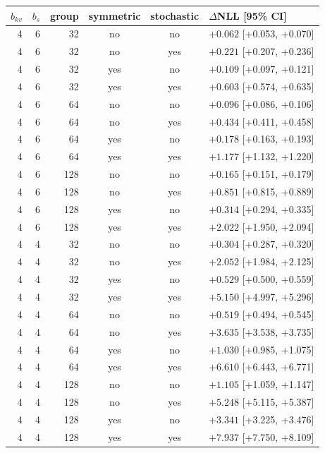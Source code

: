 \begin{tabular}{rrrccl}
\toprule
$b_{kv}$ & $b_s$ & group & symmetric & stochastic & $\Delta$NLL [95\% CI] \\
\midrule
4 & 6 & 32 & no & no & $+0.062$ [+0.053, +0.070] \\
4 & 6 & 32 & no & yes & $+0.221$ [+0.207, +0.236] \\
4 & 6 & 32 & yes & no & $+0.109$ [+0.097, +0.121] \\
4 & 6 & 32 & yes & yes & $+0.603$ [+0.574, +0.635] \\
4 & 6 & 64 & no & no & $+0.096$ [+0.086, +0.106] \\
4 & 6 & 64 & no & yes & $+0.434$ [+0.411, +0.458] \\
4 & 6 & 64 & yes & no & $+0.178$ [+0.163, +0.193] \\
4 & 6 & 64 & yes & yes & $+1.177$ [+1.132, +1.220] \\
4 & 6 & 128 & no & no & $+0.165$ [+0.151, +0.179] \\
4 & 6 & 128 & no & yes & $+0.851$ [+0.815, +0.889] \\
4 & 6 & 128 & yes & no & $+0.314$ [+0.294, +0.335] \\
4 & 6 & 128 & yes & yes & $+2.022$ [+1.950, +2.094] \\
4 & 4 & 32 & no & no & $+0.304$ [+0.287, +0.320] \\
4 & 4 & 32 & no & yes & $+2.052$ [+1.984, +2.125] \\
4 & 4 & 32 & yes & no & $+0.529$ [+0.500, +0.559] \\
4 & 4 & 32 & yes & yes & $+5.150$ [+4.997, +5.296] \\
4 & 4 & 64 & no & no & $+0.519$ [+0.494, +0.545] \\
4 & 4 & 64 & no & yes & $+3.635$ [+3.538, +3.735] \\
4 & 4 & 64 & yes & no & $+1.030$ [+0.985, +1.075] \\
4 & 4 & 64 & yes & yes & $+6.610$ [+6.443, +6.771] \\
4 & 4 & 128 & no & no & $+1.105$ [+1.059, +1.147] \\
4 & 4 & 128 & no & yes & $+5.248$ [+5.115, +5.387] \\
4 & 4 & 128 & yes & no & $+3.341$ [+3.225, +3.476] \\
4 & 4 & 128 & yes & yes & $+7.937$ [+7.750, +8.109] \\
\bottomrule
\end{tabular}
